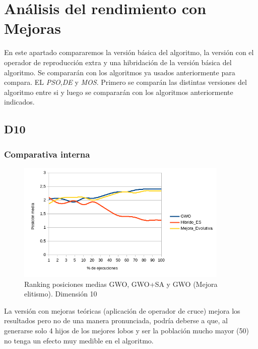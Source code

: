 \documentclass[a4paper]{report}
\begin{document}
\section{Análisis del rendimiento con Mejoras}

En este apartado compararemos la versión básica del algoritmo, la versión con el operador de reproducción extra y una hibridación de la versión básica del algoritmo. Se compararán con los algoritmos ya usados anteriormente para compara. EL \textit{PSO},\textit{DE} y \textit{MOS}. Primero se comparán las distintas versiones del algoritmo entre si y luego se compararán con los algoritmos anteriormente indicados.

\subsection{D10}

\subsubsection{Comparativa interna}







\begin{figure}[H]
    \centering
    \caption{Ranking posiciones medias GWO, GWO+SA y GWO (Mejora elitismo). Dimensión 10}
    \includegraphics[width=0.9\textwidth]{Resultados/Analisis_final/D10/GWO/Grafico_puestos.png}

\end{figure}

La versión con mejoras teóricas (aplicación de operador de cruce) mejora los resultados pero no de una manera pronunciada, podría deberse a que, al generarse solo 4 hijos de los mejores lobos y ser la población mucho mayor (50) no tenga un efecto muy medible en el algoritmo.
\end{document}
